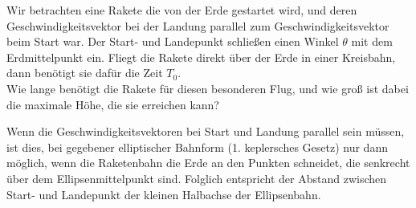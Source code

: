 \begin{Exercise}[label = cmparallel, difficulty = 3, origin = P. Gnädig, title = Parallellandung]
	Wir betrachten eine Rakete die von der Erde gestartet wird, und deren Geschwindigkeitsvektor bei der Landung parallel zum Geschwindigkeitsvektor beim Start war. Der Start- und Landepunkt schließen einen Winkel $\theta$ mit dem Erdmittelpunkt ein. Fliegt die Rakete direkt über der Erde in einer Kreisbahn, dann benötigt sie dafür die Zeit $T_0$. \\
	Wie lange benötigt die Rakete für diesen besonderen Flug, und wie groß ist dabei die maximale Höhe, die sie erreichen kann?
\end{Exercise}
\begin{Answer}[ref = cmparalle]
	Wenn die Geschwindigkeitsvektoren bei Start und Landung parallel sein müssen, ist dies, bei gegebener elliptischer Bahnform (1. keplersches Gesetz) nur dann möglich, wenn die Raketenbahn die Erde an den Punkten schneidet, die senkrecht über dem Ellipsenmittelpunkt sind. Folglich entspricht der Abstand zwischen Start- und Landepunkt der kleinen Halbachse der Ellipsenbahn.\\
	 
\end{Answer}